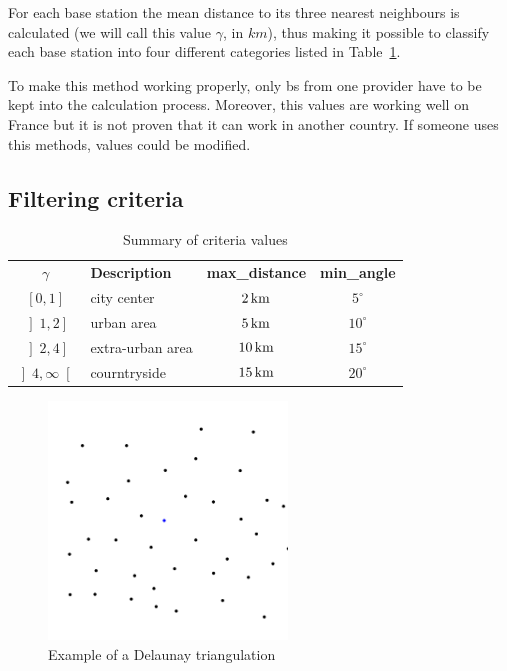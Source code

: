 \documentclass[lettersize,journal,english]{IEEEtran}
\begin{document}
For each base station the mean distance to its three nearest neighbours is calculated (we will call this value $\gamma$, in $\unit{km}$), thus making it possible to classify each base station into four different categories listed in Table~\ref{crit_summary}.

To make this method working properly, only \acrshort{bs} from one provider have to be kept into the calculation process.
Moreover, this values are working well on France but it is not proven that it can work in another country. If someone uses this methods, values could be modified.

\subsection{Filtering criteria}

\begin{table}[!b]
    \centering
    \caption{Summary of criteria values}
    \label{crit_summary}
    \begin{tabular}{clcc}
        \toprule
        \textbf{$\gamma$} & \textbf{Description} & \textbf{max\_distance} & \textbf{min\_angle} \\
        \cmidrule(lr){1-4}
        $\left[0, 1\right]$ & city center & $\unit[2]{km}$ & $5^\circ$ \\
        $\left]1, 2\right]$ & urban area & $\unit[5]{km}$ & $10^\circ$ \\
        $\left]2, 4\right]$ & extra-urban area & $\unit[10]{km}$ & $15^\circ$ \\
        $\left]4, \infty\right[$ & courntryside & $\unit[15]{km}$ & $20^\circ$ \\
        \bottomrule
    \end{tabular}
\end{table}

\begin{figure}[!t]
    \centering
    \includegraphics[width=2.5in]{images/illus_crit/points.png}
    \caption{Example of a Delaunay triangulation}
    \label{crit_pts}
\end{figure}
\end{document}
